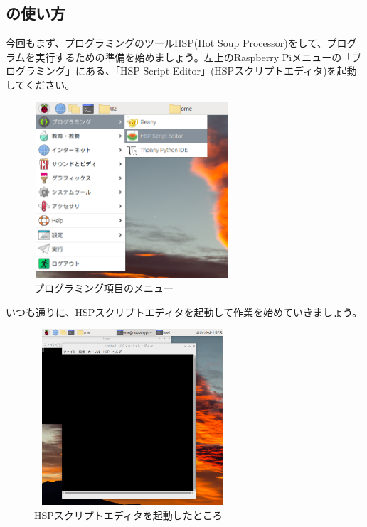 \newpage
\subsection{の使い方}

今回もまず、プログラミングのツールHSP(Hot Soup Processor)をして、プログラムを実行するための準備を始めましょう。左上のRaspberry Piメニューの「プログラミング」にある、「HSP Script Editor」(HSPスクリプトエディタ)を起動してください。


\begin{figure}[H]
    \begin{center}
      \includegraphics[keepaspectratio,width=7.31cm,height=6.562cm]{text04-img/s_hspmenu.png}
      \caption{プログラミング項目のメニュー}
    \end{center}
\end{figure}


いつも通りに、HSPスクリプトエディタを起動して作業を始めていきましょう。

\begin{figure}[H]
    \begin{center}
      \includegraphics[keepaspectratio,width=7.31cm,height=6.562cm]{text04-img/s_hsed.png}
      \caption{HSPスクリプトエディタを起動したところ}
    \end{center}
    \label{fig:prog_menu}
\end{figure}
\clearpage




